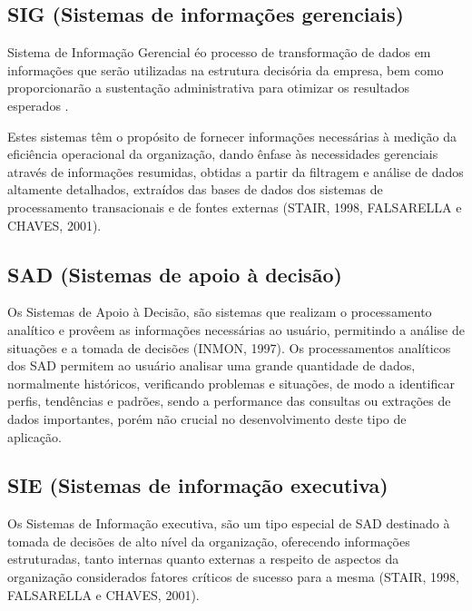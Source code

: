 \subsection{SIG (Sistemas de informa\c{c}\~{o}es gerenciais)}

Sistema de Informa\c{c}\~{a}o Gerencial \'{e}o processo de transforma\c{c}\~{a}o de dados em informa\c{c}\~{o}es que ser\~{a}o utilizadas na estrutura decis\'{o}ria da empresa, bem como proporcionar\~{a}o a sustenta\c{c}\~{a}o administrativa para otimizar os resultados esperados \cite{si-oliveira-1998}.

\begin{flushleft}
	Estes sistemas têm o prop\'{o}sito de fornecer informa\c{c}\~{o}es necess\'{a}rias \`{a} medi\c{c}\~{a}o da eficiência operacional da organiza\c{c}\~{a}o, dando ênfase \`{a}s necessidades gerenciais atrav\'{e}s de informa\c{c}\~{o}es resumidas, obtidas a partir da filtragem e an\'{a}lise de dados altamente detalhados, extra\'{i}dos das bases de dados dos sistemas de processamento transacionais e de fontes externas (STAIR, 1998, FALSARELLA e CHAVES, 2001).
\end{flushleft}

\subsection{SAD (Sistemas de apoio \`{a} decis\~{a}o)}

Os Sistemas de Apoio \`{a} Decis\~{a}o, s\~{a}o sistemas que realizam o processamento anal\'{i}tico e provêem as informa\c{c}\~{o}es necess\'{a}rias ao usu\'{a}rio, permitindo a an\'{a}lise de situa\c{c}\~{o}es e a tomada de decis\~{o}es (INMON, 1997).
Os processamentos anal\'{i}ticos dos SAD permitem ao usu\'{a}rio analisar uma grande quantidade de dados, normalmente hist\'{o}ricos, verificando problemas e situa\c{c}\~{o}es, de modo a identificar perfis, tendências e padr\~{o}es, sendo a performance das consultas ou extra\c{c}\~{o}es de dados importantes, por\'{e}m n\~{a}o crucial no desenvolvimento deste tipo de aplica\c{c}\~{a}o.

\subsection{SIE (Sistemas de informa\c{c}\~{a}o executiva)}

Os Sistemas de Informa\c{c}\~{a}o executiva, s\~{a}o um tipo especial de SAD destinado \`{a} tomada de decis\~{o}es de alto n\'{i}vel da organiza\c{c}\~{a}o, oferecendo informa\c{c}\~{o}es estruturadas, tanto internas quanto externas a respeito de aspectos da organiza\c{c}\~{a}o considerados fatores cr\'{i}ticos de sucesso para a mesma (STAIR, 1998, FALSARELLA e CHAVES, 2001).

